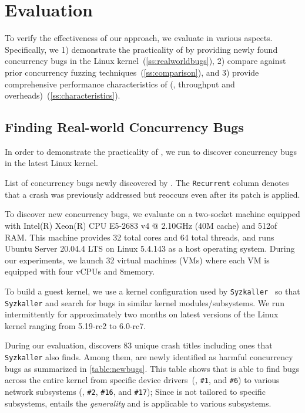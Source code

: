 \section{Evaluation}
\label{s:eval}

To verify the effectiveness of our approach, we evaluate \sys in
various aspects.
%
Specifically, we 1) demonstrate the practicality of \sys by providing
newly found concurrency bugs in the Linux
kernel~(\autoref{ss:realworldbugs}),
%
2) compare \sys against prior concurrency fuzzing
techniques~(\autoref{ss:comparison}), and
%
3) provide comprehensive performance characteristics of \sys (\eg,
throughput and overheads)~(\autoref{ss:characteristics}).
%

\subsection{Finding Real-world Concurrency Bugs}
\label{ss:realworldbugs}

In order to demonstrate the practicality of \sys, we run \sys to
discover concurrency bugs in the latest Linux kernel.

\begin{table}[t]
  \centering
  
  \caption{List of concurrency bugs newly discovered by \sys. The
    \texttt{Recurrent} column denotes that a crash was previously
    addressed but reoccurs even after its patch is applied.}
  \label{table:newbugs}
\end{table}

%
To discover new concurrency bugs, we evaluate \sys on a two-socket
machine equipped with Intel(R) Xeon(R) CPU E5-2683 v4 @ 2.10GHz (40M
cache) and 512\GB of RAM.
%
This machine provides 32 total cores and 64 total threads, and runs
Ubuntu Server 20.04.4 LTS on Linux 5.4.143 as a host operating system.
%
During our experiments, we launch 32 virtual machines (VMs) where each
VM is equipped with four vCPUs and 8\GB memory.

To build a guest kernel, we use a kernel configuration used by
\texttt{Syzkaller}~\cite{syzkaller} so that \texttt{Syzkaller} and
\sys search for bugs in similar kernel modules/subsystems.
%
We run intermittently \sys for approximately two months on latest
versions of the Linux kernel ranging from 5.19-rc2 to 6.0-rc7.


%
During our evaluation, \sys discovers 83 unique crash titles including
ones that \texttt{Syzkaller} also finds. Among them, \totalbugs are
newly identified as harmful concurrency bugs as summarized in
\autoref{table:newbugs}.
%
This table shows that \sys is able to find bugs across the entire
kernel from specific device drivers~(\eg, \texttt{\#1}, and
\texttt{\#6}) to various network subsystems (\eg, \texttt{\#2},
\texttt{\#16}, and \texttt{\#17}); Since \sys is not tailored to
specific subsystems, \sys entails the \textit{generality} and is
applicable to various subsystems.

